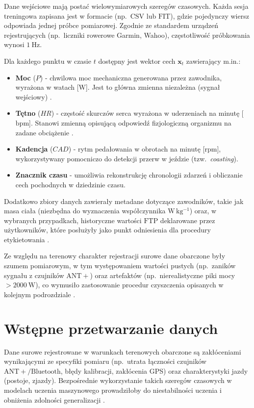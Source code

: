 Dane wejściowe mają postać wielowymiarowych szeregów czasowych.
Każda sesja treningowa zapisana jest w formacie (np.\ $\mathrm{CSV}$ lub $\mathrm{FIT}$), gdzie pojedynczy wiersz odpowiada jednej próbce pomiarowej.
Zgodnie ze standardem urządzeń rejestrujących (np.\ liczniki rowerowe Garmin, Wahoo), częstotliwość próbkowania wynosi $1\ \mathrm{Hz}$.

Dla każdego punktu w czasie $t$ dostępny jest wektor cech $\mathbf{x}_t$ zawierający m.in.:
\begin{itemize}
  \item \textbf{Moc} ($P$) - chwilowa moc mechaniczna generowana przez zawodnika, wyrażona w watach [$\mathrm{W}$]. Jest to główna zmienna niezależna (sygnał wejściowy) \cite{allen2019power}.
  \item \textbf{Tętno} ($HR$) - częstość skurczów serca wyrażona w uderzeniach na minutę [$\mathrm{bpm}$]. Stanowi zmienną opisującą odpowiedź fizjologiczną organizmu na zadane obciążenie \cite{borszcz2018ftp,sitko2022tte}.
  \item \textbf{Kadencja} ($CAD$) - rytm pedałowania w obrotach na minutę [$\mathrm{rpm}$], wykorzystywany pomocniczo do detekcji przerw w jeździe (tzw.\ \textit{coasting}).
  \item \textbf{Znacznik czasu} - umożliwia rekonstrukcję chronologii zdarzeń i obliczanie cech pochodnych w dziedzinie czasu.
\end{itemize}

Dodatkowo zbiory danych zawierały metadane dotyczące zawodników, takie jak masa ciała (niezbędna do wyznaczenia współczynnika $\mathrm{W\,kg^{-1}}$) oraz, w wybranych przypadkach, historyczne wartości $\mathrm{FTP}$ deklarowane przez użytkowników, które posłużyły jako punkt odniesienia dla procedury etykietowania \cite{stockwell2023mlftp}.

Ze względu na terenowy charakter rejestracji surowe dane obarczone były szumem pomiarowym, w tym występowaniem wartości pustych (np.\ zaników sygnału z czujników $\mathrm{ANT+}$) oraz artefaktów (np.\ nierealistyczne piki mocy $> 2000\ \mathrm{W}$), co wymusiło zastosowanie procedur czyszczenia opisanych w kolejnym podrozdziale \cite{uspatent2024ftp}.

\section{Wstępne przetwarzanie danych}

Dane surowe rejestrowane w warunkach terenowych obarczone są zakłóceniami wynikającymi ze specyfiki pomiaru (np.\ utrata łączności czujników $\mathrm{ANT+}/\mathrm{Bluetooth}$, błędy kalibracji, zakłócenia GPS) oraz charakterystyki jazdy (postoje, zjazdy).
Bezpośrednie wykorzystanie takich szeregów czasowych w modelach uczenia maszynowego prowadziłoby do niestabilności uczenia i obniżenia zdolności generalizacji \cite{stockwell2023mlftp}.

